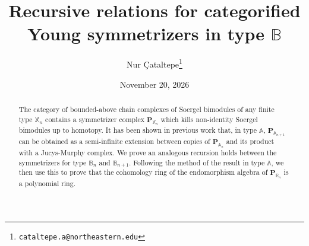 \documentclass[11pt]{article}
\title{Recursive relations for categorified Young symmetrizers
in type $\mathbb{B}$}
\author{Nur \c{C}ataltepe\thanks{\texttt{cataltepe.a@northeastern.edu}}}
\affil{Department of Mathematics, Northeastern University}
\date{November 20, 2026}
\theoremstyle{definition}
\theoremstyle{remark}
\numberwithin{equation}{section}
\begin{document}
\maketitle
\begin{abstract}
\noindent The category of bounded-above chain complexes
of Soergel bimodules of any finite type $\mathbb{X}_n$
contains a symmetrizer complex $\mathbf{P}_{\mathbb{X}_n}$ which
kills non-identity Soergel bimodules up to homotopy. It has been shown in
previous work that, in type $\mathbb{A}$,
$\mathbf{P}_{\mathbb{A}_{n+1}}$ can be obtained as a
semi-infinite
extension between copies of
$\mathbf{P}_{\mathbb{A}_n}$ and its product with a
Jucys-Murphy complex. We prove
an analogous recursion holds between the symmetrizers for
type $\mathbb{B}_n$ and $\mathbb{B}_{n+1}$. Following the method of the result in type $\mathbb{A}$,
we then use this to prove that the cohomology ring of the
endomorphism algebra of
$\mathbf{P}_{\mathbb{B}_n}$ is a polynomial ring.
\end{abstract}
\end{document}
